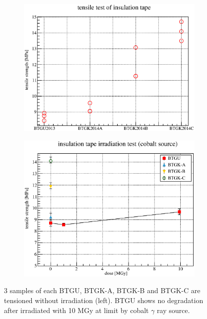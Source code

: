  \begin{figure}[H]
  \begin{subfigure}{0.3\textwidth}
   \centering
   \includegraphics[scale=0.43]{chapter4/fig/gubt.eps}
  \end{subfigure}
  \hspace{0.2\textwidth}
  \begin{subfigure}{0.3\textwidth}
   \centering
   \includegraphics[scale=0.43]{chapter4/fig/BTGU2.eps}
  \end{subfigure}
  \caption{3 samples of each BTGU, BTGK-A, BTGK-B and BTGK-C are tensioned without irradiation (left). BTGU shows no degradation after irradiated with 10 MGy at limit by cobalt $\gamma$ ray source.}
  \label{3gubt}
 \end{figure}

